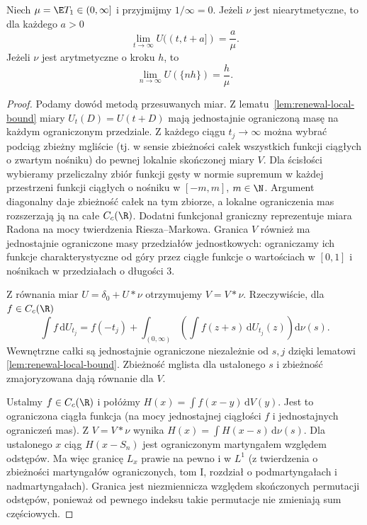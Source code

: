 \begin{twierdzenie}
\label{thm:blackwell-renewal}
Niech $\mu=\E T_1\in(0,\infty]$ i przyjmijmy
$1/\infty=0$.
Jeżeli $\nu$ jest niearytmetyczne, to dla każdego $a>0$
\[
\lim_{t\to\infty}U((t,t+a])=\frac a\mu.
\]
Jeżeli $\nu$ jest arytmetyczne o kroku $h$, to
\[
\lim_{n\to\infty}U(\{nh\})=\frac h\mu.
\]
\end{twierdzenie}
\begin{proof}
Podamy dowód metodą przesuwanych miar.
Z lematu~\ref{lem:renewal-local-bound} miary
$U_t(D)=U(t+D)$ mają jednostajnie ograniczoną
masę na każdym ograniczonym przedziale.
Z każdego ciągu $t_j\to\infty$ można wybrać
podciąg zbieżny mgliście (tj. w sensie zbieżności
całek wszystkich funkcji ciągłych o zwartym nośniku) do pewnej
lokalnie skończonej miary $V$.
Dla ścisłości wybieramy przeliczalny zbiór
funkcji gęsty w normie supremum w każdej
przestrzeni funkcji ciągłych o nośniku w $[-m,m]$,
$m\in\N$. Argument diagonalny daje zbieżność
całek na tym zbiorze, a lokalne ograniczenia
mas rozszerzają ją na całe $C_c(\R)$.
Dodatni funkcjonał graniczny reprezentuje
miara Radona na mocy twierdzenia Riesza--Markowa.
Granica $V$ również ma jednostajnie ograniczone
masy przedziałów jednostkowych: ograniczamy
ich funkcje charakterystyczne od góry przez
ciągłe funkcje o wartościach w $[0,1]$ i nośnikach
w przedziałach o długości $3$.

Z równania miar $U=\delta_0+U*\nu$ otrzymujemy
$V=V*\nu$. Rzeczywiście, dla $f\in C_c(\R)$
\[
\int f\,\mathrm dU_{t_j}
=f(-t_j)+\int_{(0,\infty)}
\left(\int f(z+s)\,\mathrm dU_{t_j}(z)\right)\mathrm d\nu(s).
\]
Wewnętrzne całki są jednostajnie ograniczone
niezależnie od $s,j$ dzięki lematowi
\ref{lem:renewal-local-bound}. Zbieżność mglista
dla ustalonego $s$ i zbieżność zmajoryzowana
dają równanie dla $V$.

Ustalmy $f\in C_c(\R)$ i połóżmy
$H(x)=\int f(x-y)\,\mathrm dV(y)$.
Jest to ograniczona ciągła funkcja
(na mocy jednostajnej ciągłości $f$ i
jednostajnych ograniczeń mas).
Z $V=V*\nu$ wynika
$H(x)=\int H(x-s)\,\mathrm d\nu(s)$.
Dla ustalonego $x$ ciąg $H(x-S_n)$ jest
ograniczonym martyngałem względem odstępów.
Ma więc granicę $L_x$ prawie na pewno i w $L^1$
(z twierdzenia o zbieżności martyngałów ograniczonych,
tom I, rozdział o podmartyngałach i nadmartyngałach).
Granica jest niezmiennicza względem skończonych
permutacji odstępów, ponieważ od pewnego indeksu
takie permutacje nie zmieniają sum częściowych.


\end{proof}
